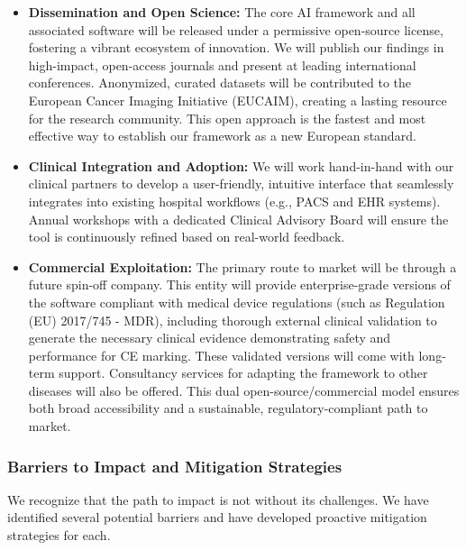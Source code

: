 \documentclass[11pt, a4paper]{article}
\begin{document}
\begin{itemize}
    \item \textbf{Dissemination and Open Science:} The core AI framework and all associated software will be released under a permissive open-source license, fostering a vibrant ecosystem of innovation. We will publish our findings in high-impact, open-access journals and present at leading international conferences. Anonymized, curated datasets will be contributed to the European Cancer Imaging Initiative (EUCAIM), creating a lasting resource for the research community. This open approach is the fastest and most effective way to establish our framework as a new European standard.

    \item \textbf{Clinical Integration and Adoption:} We will work hand-in-hand with our clinical partners to develop a user-friendly, intuitive interface that seamlessly integrates into existing hospital workflows (e.g., PACS and EHR systems). Annual workshops with a dedicated Clinical Advisory Board will ensure the tool is continuously refined based on real-world feedback.

  \item \textbf{Commercial Exploitation:} The primary route to market will be through a future spin-off company. This entity will provide enterprise-grade versions of the software compliant with medical device regulations (such as Regulation (EU) 2017/745 - MDR), including thorough external clinical validation to generate the necessary clinical evidence demonstrating safety and performance for CE marking. These validated versions will come with long-term support. Consultancy services for adapting the framework to other diseases will also be offered. This dual open-source/commercial model ensures both broad accessibility and a sustainable, regulatory-compliant path to market.
\end{itemize}

\subsubsection{Barriers to Impact and Mitigation Strategies}

We recognize that the path to impact is not without its challenges. We have identified several potential barriers and have developed proactive mitigation strategies for each.
\end{document}
